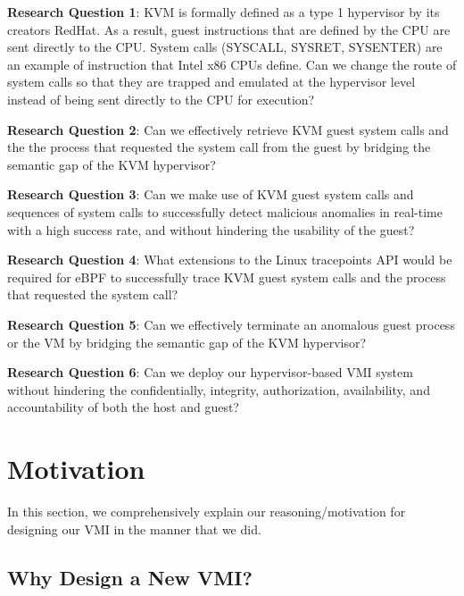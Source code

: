 \documentclass{report}
\begin{document}
\begin{spacing}{1.5}
{\large
\noindent \textbf{Research Question 1}: KVM is formally defined as a type 1 hypervisor by its creators RedHat. As a result, guest instructions that are defined by the CPU are sent directly to the CPU. System calls (SYSCALL, SYSRET, SYSENTER) are an example of instruction that Intel x86 CPUs define. Can we change the route of system calls so that they are trapped and emulated at the hypervisor level instead of being sent directly to the CPU for execution?
\newline
}

{\large
\noindent \textbf{Research Question 2}: Can we effectively retrieve KVM guest system calls and the the process that requested the system call from the guest by bridging the semantic gap of the KVM hypervisor?
\newline
}


{\large
\noindent \textbf{Research Question 3}: Can we make use of KVM guest system calls and sequences of system calls to successfully detect malicious anomalies in real-time with a high success rate, and without hindering the usability of the guest?
\newline
}


{\large
\noindent \textbf{Research Question 4}: What extensions to the Linux tracepoints API would be required for eBPF to successfully trace KVM guest system calls and the process that requested the system call?
\newline
}

{\large
\noindent \textbf{Research Question 5}: Can we effectively terminate an anomalous guest process or the VM by bridging the semantic gap of the KVM hypervisor?
\newline
}

{\large
\noindent \textbf{Research Question 6}: Can we deploy our hypervisor-based VMI system without hindering the confidentially, integrity, authorization, availability, and accountability of both the host and guest?  
\newline
}


\section{Motivation}

{\large 
In this section, we comprehensively explain our reasoning/motivation for designing our VMI in the manner that we did.
}
 

\subsection{Why Design a New VMI?}


\end{spacing}
\end{document}
